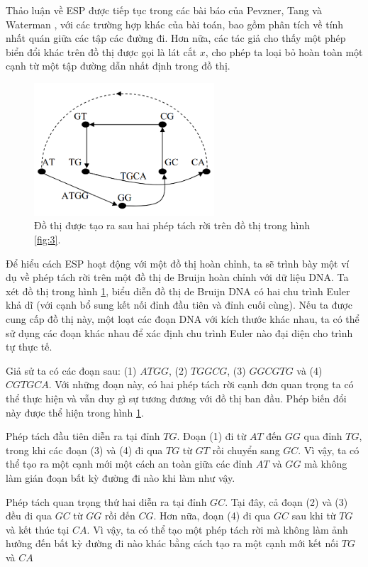 \documentclass[14pt, a4paper]{article}
\numberwithin{equation}{section}
\numberwithin{figure}{section}
\numberwithin{dl}{section}
\numberwithin{md}{section}
\numberwithin{bd}{section}
\numberwithin{dn}{section}
\numberwithin{hq}{section}
\begin{document}
    Thảo luận về ESP được tiếp tục trong các bài báo của Pevzner, Tang và Waterman \cite{pevzner2001eulerian}, \cite{pevzner2001new} với các trường hợp khác của bài toán, bao gồm phân tích về tính nhất quán giữa các tập các đường đi.
    Hơn nữa, các tác giả cho thấy một phép biển đổi khác trên đồ thị được gọi là lát cắt $x$, cho phép ta loại bỏ hoàn toàn một cạnh từ một tập đường dẫn nhất định trong đồ thị.

    \begin{figure}[h!]
        \centering
        \includegraphics[width=0.6\textwidth]{8.png}
        \caption{Đồ thị được tạo ra sau hai phép tách rời trên đồ thị trong hình \ref{fig:3}.}
        \label{fig:8}
    \end{figure}


    Để hiểu cách ESP hoạt động với một đồ thị hoàn chỉnh, ta sẽ trình bày một ví dụ về phép tách rời trên một đồ thị de Bruijn hoàn chỉnh với dữ liệu DNA.
    Ta xét đồ thị trong hình \ref{fig:8}, biểu diễn đồ thị de Bruijn DNA có hai chu trình Euler khả dĩ (với cạnh bổ sung kết nối đỉnh đầu tiên và đỉnh cuối cùng).
    Nếu ta được cung cấp đồ thị này, một loạt các đoạn DNA với kích thước khác nhau, ta có thể sử dụng các đoạn khác nhau để xác định chu trình Euler nào đại diện cho trình tự thực tế.

    Giả sử ta có các đoạn sau: (1) $ATGG$, (2) $TGGCG$, (3) $GGCGTG$ và (4) $CGTGCA$.
    Với những đoạn này, có hai phép tách rời cạnh đơn quan trọng ta có thể thực hiện và vẫn duy gì sự tương đương với đồ thị ban đầu.
    Phép biến đổi này được thể hiện trong hình \ref{fig:8}.

    Phép tách đầu tiên diễn ra tại đỉnh $TG$. Đoạn (1) đi từ $AT$ đến $GG$ qua đỉnh $TG$, trong khi các đoạn (3) và (4) đi qua $TG$ từ $GT$ rồi chuyển sang $GC$.
    Vì vậy, ta có thể tạo ra một cạnh mới một cách an toàn giữa các đỉnh $AT$ và $GG$ mà không làm gián đoạn bất kỳ đường đi nào khi làm như vậy.

    Phép tách quan trọng thứ hai diễn ra tại đỉnh $GC$. Tại đây, cả đoạn (2) và (3) đều đi qua $GC$ từ $GG$ rồi đến $CG$. 
    Hơn nữa, đoạn (4) đi qua $GC$ sau khi từ $TG$ và kết thúc tại $CA$.
    Vì vậy, ta có thể tạo một phép tách rời mà không làm ảnh hưởng đến bất kỳ đường đi nào khác bằng cách tạo ra một cạnh mới kết nối $TG$ và $CA$
\end{document}

